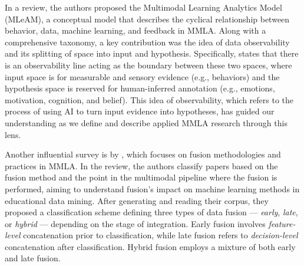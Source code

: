 \documentclass[manuscript,screen,review]{acmart}
\begin{document}
In a \citet{DiMitri2018} review, the authors proposed the Multimodal Learning Analytics Model (MLeAM), a conceptual model that describes the cyclical relationship between behavior, data, machine learning, and feedback in MMLA. Along with a comprehensive taxonomy, a key contribution was the idea of data observability and its splitting of space into input and hypothesis. Specifically, \citet{DiMitri2018} states that there is an observability line acting as the boundary between these two spaces, where input space is for measurable and sensory evidence (e.g., behaviors) and the hypothesis space is reserved for human-inferred annotation (e.g., emotions, motivation, cognition, and belief). This idea of observability, which refers to the process of using AI to turn input evidence into hypotheses, has guided our understanding as we define and describe applied MMLA research through this lens.

Another influential survey is by \citet{Chango2022}, which focuses on fusion methodologies and practices in MMLA. In the review, the authors classify papers based on the fusion method and the point in the multimodal pipeline where the fusion is performed, aiming to understand fusion's impact on machine learning methods in educational data mining. After generating and reading their corpus, they proposed a classification scheme defining three types of data fusion --- \textit{early}, \textit{late}, or \textit{hybrid} --- depending on the stage of integration. Early fusion involves \textit{feature-level} concatenation prior to classification, while late fusion refers to \textit{decision-level} concatenation after classification. Hybrid fusion employs a mixture of both early and late fusion.
\end{document}
